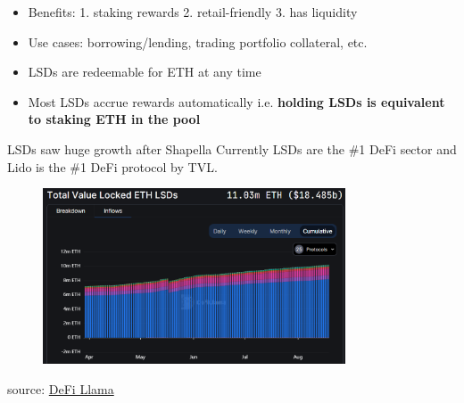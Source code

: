 \documentclass{beamer}
\begin{document}
\begin{frame}
\begin{itemize}
        \item Benefits: 1. staking rewards 2. retail-friendly 3. has liquidity
        \item Use cases: borrowing/lending, trading portfolio collateral, etc.
        \item LSDs are redeemable for ETH at any time
        \item Most LSDs accrue rewards automatically i.e. \textbf{holding LSDs is equivalent to staking ETH in the pool}
    \end{itemize}
\end{frame}

\begin{frame}{LSDs saw huge growth after Shapella}
    Currently LSDs are the \#1 DeFi sector and Lido is the \#1 DeFi protocol by TVL.
    \begin{figure}
        \centering
        \includegraphics[width=0.8\textwidth]{figures/lsd_2023.png}
    \end{figure}
    \tiny{source: \href{https://defillama.com/lsd}{DeFi Llama}}
    
\end{frame}

\end{document}
